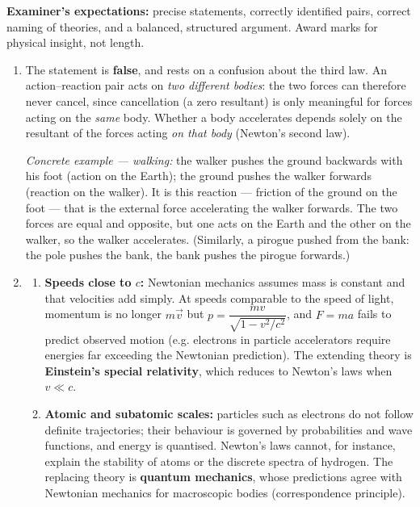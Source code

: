 \documentclass[11pt]{article}
\begin{document}
\begin{corrige}
\textbf{Examiner's expectations:} precise statements, correctly identified pairs, correct naming of theories, and a balanced, structured argument. Award marks for physical insight, not length.

\begin{enumerate}
\item The statement is \textbf{false}, and rests on a confusion about the third law. An action--reaction pair acts on \emph{two different bodies}: the two forces can therefore never cancel, since cancellation (a zero resultant) is only meaningful for forces acting on the \emph{same} body. Whether a body accelerates depends solely on the resultant of the forces acting \emph{on that body} (Newton's second law).

\emph{Concrete example --- walking:} the walker pushes the ground backwards with his foot (action on the Earth); the ground pushes the walker forwards (reaction on the walker). It is this reaction --- friction of the ground on the foot --- that is the external force accelerating the walker forwards. The two forces are equal and opposite, but one acts on the Earth and the other on the walker, so the walker accelerates. (Similarly, a pirogue pushed from the bank: the pole pushes the bank, the bank pushes the pirogue forwards.)

\item \begin{enumerate}
\item \textbf{Speeds close to $c$:} Newtonian mechanics assumes mass is constant and that velocities add simply. At speeds comparable to the speed of light, momentum is no longer $m\vec{v}$ but $p=\dfrac{mv}{\sqrt{1-v^2/c^2}}$, and $F=ma$ fails to predict observed motion (e.g. electrons in particle accelerators require energies far exceeding the Newtonian prediction). The extending theory is \textbf{Einstein's special relativity}, which reduces to Newton's laws when $v\ll c$.
\item \textbf{Atomic and subatomic scales:} particles such as electrons do not follow definite trajectories; their behaviour is governed by probabilities and wave functions, and energy is quantised. Newton's laws cannot, for instance, explain the stability of atoms or the discrete spectra of hydrogen. The replacing theory is \textbf{quantum mechanics}, whose predictions agree with Newtonian mechanics for macroscopic bodies (correspondence principle).
\end{enumerate}


\end{enumerate}
\end{corrige}
\end{document}
